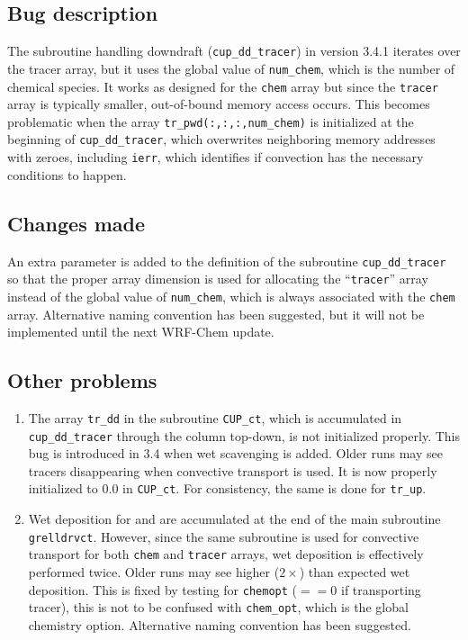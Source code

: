 \subsection{Bug description}\label{a-ssec:bug/ctrans/bug}
	The subroutine handling downdraft (\texttt{cup\_dd\_tracer}) in version 3.4.1 iterates over the tracer array, but it uses the global value of \texttt{num\_chem}, which is the number of chemical species. It works as designed for the \texttt{chem} array but since the \texttt{tracer} array is typically smaller, out-of-bound memory access occurs. This becomes problematic when the array \texttt{tr\_pwd(:,:,:,num\_chem)} is initialized at the beginning of \texttt{cup\_dd\_tracer}, which overwrites neighboring memory addresses with zeroes, including \texttt{ierr}, which identifies if convection has the necessary conditions to happen.

\subsection{Changes made}\label{a-ssec:bug/ctrans/fix}
	An extra parameter is added to the definition of the subroutine \texttt{cup\_dd\_tracer} so that the proper array dimension is used for allocating the ``\texttt{tracer}'' array instead of the global value of \texttt{num\_chem}, which is always associated with the \texttt{chem} array. Alternative naming convention has been suggested, but it will not be implemented until the next WRF-Chem update.

\subsection{Other problems}\label{a-ssec:bug/ctrans/misc}
	\begin{enumerate}
		\item The array \texttt{tr\_dd} in the subroutine \texttt{CUP\_ct}, which is accumulated in \texttt{cup\_dd\_tracer} through the column top-down, is not initialized properly. This bug is introduced in 3.4 when wet scavenging is added. Older runs may see tracers disappearing when convective transport is used. It is now properly initialized to $0.0$ in \texttt{CUP\_ct}. For consistency, the same is done for \texttt{tr\_up}.
		\item Wet deposition for  and  are accumulated at the end of the main subroutine \texttt{grelldrvct}. However, since the same subroutine is used for convective transport for both \texttt{chem} and \texttt{tracer} arrays, wet deposition is effectively performed twice. Older runs may see higher ($2\times$) than expected wet deposition. This is fixed by testing for \texttt{chemopt} ($==0$ if transporting tracer), this is not to be confused with \texttt{chem\_opt}, which is the global chemistry option. Alternative naming convention has been suggested.
	\end{enumerate}